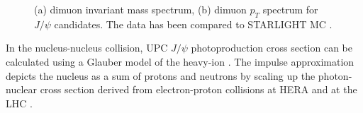 \begin{figure}%
    \centering
    \qquad
    \caption{(a) dimuon invariant mass spectrum, (b) dimuon $p_T$ spectrum for $J/\psi$ candidates. The data has been compared to STARLIGHT MC \cite{Khachatryan:2016qhq}.}%
    \label{fig:patKennyPlots}%
\end{figure}

In the nucleus-nucleus collision, UPC $J/\psi$ photoproduction cross section can be calculated using a Glauber model of the heavy-ion \cite{Brodsky:1994kf}. The impulse approximation depicts the nucleus as a sum of protons and neutrons by scaling up the photon-nuclear cross section derived from electron-proton collisions at HERA and at the LHC \cite{Miller:2007ri}.

